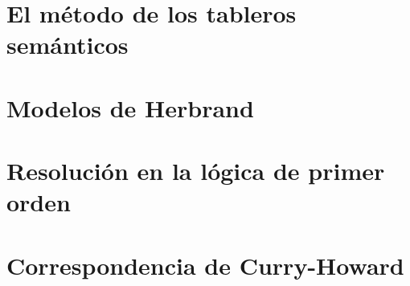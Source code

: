 \documentclass{beamer}
\begin{document}
\section{El método de los tableros semánticos}
\begin{frame}
  
\end{frame}

\section{Modelos de Herbrand}
\section{Resolución en la lógica de primer orden}
\section{Correspondencia de Curry-Howard}
\end{document}
